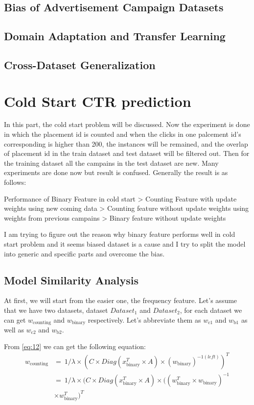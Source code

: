 \documentclass{sig-alternate}
\begin{document}
\subsection{Bias of Advertisement Campaign Datasets}
\subsection{Domain Adaptation and Transfer Learning}
\subsection{Cross-Dataset Generalization}

\section{Cold Start CTR prediction}
In this part, the cold start problem will be discussed. Now the experiment is done in which the placement id is counted and when the clicks in one palcement id's corresponding is higher than 200, the instances will be remained, and the overlap of placement id in the train dataset and test dataset will be filtered out. Then for the training dataset all the campains in the test dataset are new. Many experiments are done now but result is confused. Generally the result is as follows: 

Performance of Binary Feature in cold start > Counting Feature with update weights using new coming data > Counting feature without update weights using weights from previous campains > Binary feature without update weights


I am trying to figure out the reason why binary feature performs well in cold start problem and it seems biased dataset is a cause and I try to split the model into generic and specific parts and overcome the bias.
\subsection{Model Similarity Analysis}
At first, we will start from the easier one, the frequency feature. Let's assume that we have two datasets, dataset \(Dataset_{\text{1}}\) and \(Dataset_{\text{2}}\), for each dataset we can get \(w_{\text{counting}}\) and \(w_{\text{binary}}\) respectively. Let's abbreviate them as \(w_{\text{c1}}\) and \(w_{\text{b1}}\) as well as \(w_{\text{c2}}\) and \(w_{\text{b2}}\). 

From \ref{eq:12} we can get the following equation:
\begin{equation} \label{eq:28}
\begin{split}
w_{\text{counting}} & =\ 1/{\lambda} \times (C \times Diag(x_{\text{binary}}^T \times A) \times (w_{\text{binary}})^{-1(left)})^T \\
& = \ 1/{\lambda} \times (C \times Diag(x_{\text{binary}}^T \times A) \times ((w_{\text{binary}}^T \times w_{\text{binary}})^{-1} \\
& \times w_{\text{binary}}^T )^T
\end{split}
\end{equation}
\end{document}

